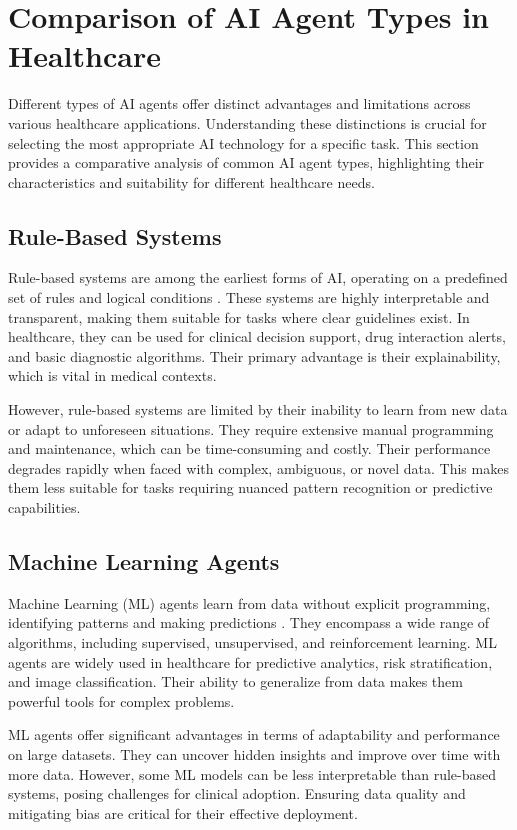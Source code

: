 \documentclass[12pt,a4paper]{article}
\begin{document}
\section{Comparison of AI Agent Types in Healthcare}
Different types of AI agents offer distinct advantages and limitations across various healthcare applications. Understanding these distinctions is crucial for selecting the most appropriate AI technology for a specific task. This section provides a comparative analysis of common AI agent types, highlighting their characteristics and suitability for different healthcare needs.

\subsection{Rule-Based Systems}
Rule-based systems are among the earliest forms of AI, operating on a predefined set of rules and logical conditions \cite{russell2010artificial}. These systems are highly interpretable and transparent, making them suitable for tasks where clear guidelines exist. In healthcare, they can be used for clinical decision support, drug interaction alerts, and basic diagnostic algorithms. Their primary advantage is their explainability, which is vital in medical contexts.

However, rule-based systems are limited by their inability to learn from new data or adapt to unforeseen situations. They require extensive manual programming and maintenance, which can be time-consuming and costly. Their performance degrades rapidly when faced with complex, ambiguous, or novel data. This makes them less suitable for tasks requiring nuanced pattern recognition or predictive capabilities.

\subsection{Machine Learning Agents}
Machine Learning (ML) agents learn from data without explicit programming, identifying patterns and making predictions \cite{lecun2015deep}. They encompass a wide range of algorithms, including supervised, unsupervised, and reinforcement learning. ML agents are widely used in healthcare for predictive analytics, risk stratification, and image classification. Their ability to generalize from data makes them powerful tools for complex problems.

ML agents offer significant advantages in terms of adaptability and performance on large datasets. They can uncover hidden insights and improve over time with more data. However, some ML models can be less interpretable than rule-based systems, posing challenges for clinical adoption. Ensuring data quality and mitigating bias are critical for their effective deployment.
\end{document}
